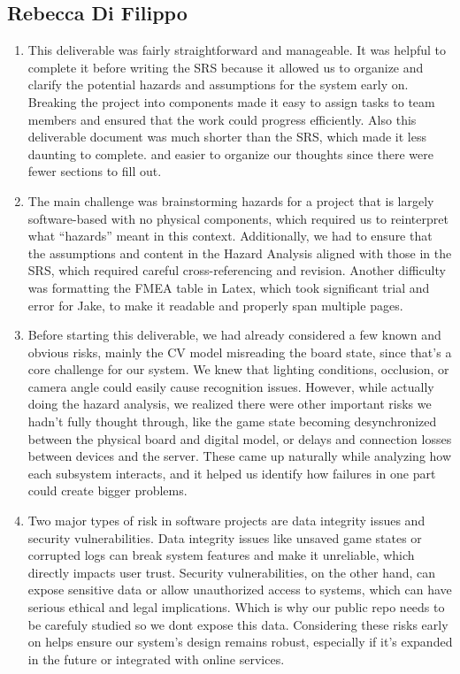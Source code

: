 \documentclass{article}
\begin{document}
\subsection*{Rebecca Di Filippo}\label{subsec:rebecca-difilippo-reflection}
\begin{enumerate}
    \item This deliverable was fairly straightforward and manageable.
     It was helpful to complete it before writing the SRS because it allowed us to organize 
     and clarify the potential hazards and assumptions for the system early on. 
     Breaking the project into components made it easy to assign tasks to team members
      and ensured that the work could progress efficiently. Also this deliverable document
    was much shorter than the SRS, which made it less daunting to complete. and easier to organize
    our thoughts since there were fewer sections to fill out.

    \item The main challenge was brainstorming hazards for a project that is largely
     software-based with no physical components, which required us to reinterpret what 
     “hazards” meant in this context. Additionally, we had to ensure that the assumptions 
     and content in the Hazard Analysis aligned with those in the SRS, which required careful
      cross-referencing and revision. Another difficulty was formatting the FMEA table in Latex,
       which took significant trial and error for Jake, to make it readable and properly span multiple pages.
       

    \item Before starting this deliverable, we had already considered a few known and obvious risks, 
    mainly the CV model misreading the board state, since that’s a core challenge 
    for our system. We knew that lighting conditions, occlusion, or camera angle could easily cause 
    recognition issues. However, while actually doing the hazard analysis, we realized there were 
    other important risks we hadn’t fully thought through, like the game state becoming desynchronized
     between the physical board and digital model, or delays and connection losses between devices and
      the server. These came up naturally while analyzing how each subsystem interacts, and it helped 
      us identify how failures in one part could create bigger problems.

    \item Two major types of risk in software projects are data integrity issues and security
     vulnerabilities. Data integrity issues like unsaved game states or corrupted logs can break
      system features and make it unreliable, which directly impacts user trust. Security 
      vulnerabilities, on the other hand, can expose sensitive data or allow unauthorized access 
      to systems, which can have serious ethical and legal implications. Which is why our public repo
      needs to be carefuly studied so we dont expose this data. Considering these risks early on helps ensure
        our system’s design remains robust, especially if it’s expanded in the future or integrated 
        with online services.
\end{enumerate}
\end{document}
